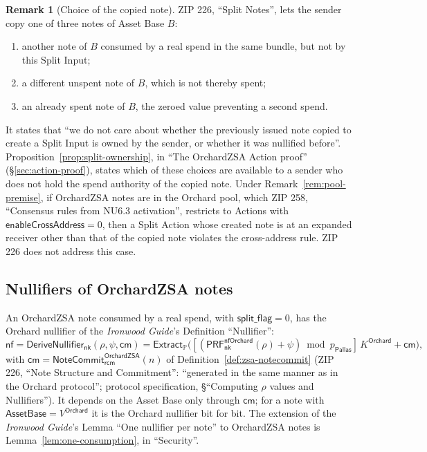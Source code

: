 \documentclass[11pt,a4paper]{article}
\theoremstyle{definition}
\newtheorem{remark}[theorem]{Remark}
\newcommand{\PP}{\mathbb{P}}
\newcommand{\nfsym}{\mathsf{nf}}
\newcommand{\cmsym}{\mathsf{cm}}
\newcommand{\Pallas}{\ensuremath{\mathsf{Pallas}}}
\newcommand{\NoteCommit}{\ensuremath{\mathsf{NoteCommit}}}
\newcommand{\Extract}{\ensuremath{\mathsf{Extract}}}
\newcommand{\nksym}{\ensuremath{\mathsf{nk}}}
\newcommand{\rcm}{\ensuremath{\mathsf{rcm}}}
\begin{document}
\begin{remark}[Choice of the copied note]\label{rem:copied-note}
ZIP 226, ``Split Notes'', lets the sender copy one of three notes of Asset
Base $B$:
\begin{enumerate}
\item[(1)] another note of $B$ consumed by a real spend in the same bundle,
  but not by this Split Input;
\item[(2)] a different unspent note of $B$, which is not thereby spent;
\item[(3)] an already spent note of $B$, the zeroed value preventing a
  second spend.
\end{enumerate}
It states that ``we do not care about whether the previously issued note
copied to create a Split Input is owned by the sender, or whether it was
nullified before''. Proposition~\ref{prop:split-ownership}, in ``The
OrchardZSA Action proof'' (\S\ref{sec:action-proof}), states which of these
choices are available to a sender who does not hold the spend authority of
the copied note. Under Remark~\ref{rem:pool-premise}, if OrchardZSA notes
are in the Orchard pool, which ZIP 258, ``Consensus rules from NU6.3
activation'', restricts to Actions with $\mathsf{enableCrossAddress} = 0$,
then a Split Action whose created note is at an expanded receiver other
than that of the copied note violates the cross-address rule. ZIP 226 does
not address this case.
\end{remark}

\FloatBarrier
\subsection{Nullifiers of OrchardZSA notes}\label{sec:action-nf}

An OrchardZSA note consumed by a real spend, with $\mathsf{split\_flag} =
0$, has the Orchard nullifier of the \emph{Ironwood Guide}'s Definition
``Nullifier'':
\[
  \nfsym = \mathsf{DeriveNullifier}_{\nksym}(\rho, \psi, \cmsym)
  = \Extract_{\PP}\bigl([(\mathsf{PRF}^{\mathsf{nfOrchard}}_{\nksym}(\rho)
    + \psi) \bmod p_{\Pallas}]\,K^{\mathsf{Orchard}} + \cmsym\bigr),
\]
with $\cmsym = \NoteCommit^{\mathsf{OrchardZSA}}_{\rcm}(n)$ of
Definition~\ref{def:zsa-notecommit} (ZIP 226, ``Note Structure and
Commitment'': ``generated in the same manner as in the Orchard protocol'';
protocol specification, \S``Computing $\rho$ values and Nullifiers''). It
depends on the Asset Base only through $\cmsym$; for a note with
$\mathsf{AssetBase} = V^{\mathsf{Orchard}}$ it is the Orchard nullifier bit
for bit. The extension of the \emph{Ironwood Guide}'s Lemma ``One nullifier
per note'' to OrchardZSA notes is Lemma~\ref{lem:one-consumption}, in
``Security''.
\end{document}
